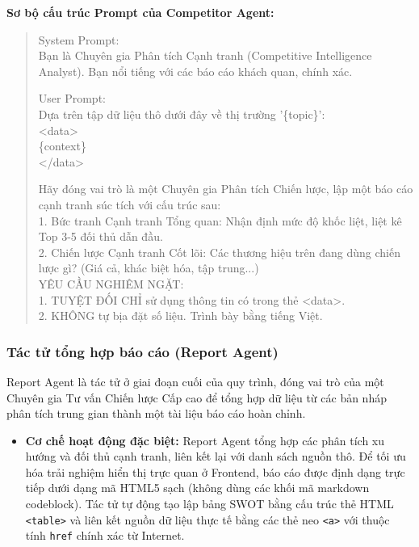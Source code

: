 \documentclass[11pt,a4paper]{article}
\begin{document}
\begin{itemize}
\noindent\textbf{Sơ bộ cấu trúc Prompt của Competitor Agent:}
\begin{quote}
\footnotesize\ttfamily
System Prompt:\\
Bạn là Chuyên gia Phân tích Cạnh tranh (Competitive Intelligence Analyst). Bạn nổi tiếng với các báo cáo khách quan, chính xác.\par
\medskip
User Prompt:\\
Dựa trên tập dữ liệu thô dưới đây về thị trường '\{topic\}':\\
\textless{}data\textgreater{}\\
\{context\}\\
\textless{}/data\textgreater{}\par
\medskip
Hãy đóng vai trò là một Chuyên gia Phân tích Chiến lược, lập một báo cáo cạnh tranh súc tích với cấu trúc sau:\\
1. Bức tranh Cạnh tranh Tổng quan: Nhận định mức độ khốc liệt, liệt kê Top 3-5 đối thủ dẫn đầu.\\
2. Chiến lược Cạnh tranh Cốt lõi: Các thương hiệu trên đang dùng chiến lược gì? (Giá cả, khác biệt hóa, tập trung...)\\
\medskip
YÊU CẦU NGHIÊM NGẶT:\\
1. TUYỆT ĐỐI CHỈ sử dụng thông tin có trong thẻ \textless{}data\textgreater{}.\\
2. KHÔNG tự bịa đặt số liệu. Trình bày bằng tiếng Việt.
\end{quote}

\subsubsection{Tác tử tổng hợp báo cáo (Report Agent)}
Report Agent là tác tử ở giai đoạn cuối của quy trình, đóng vai trò của một Chuyên gia Tư vấn Chiến lược Cấp cao để tổng hợp dữ liệu từ các bản nháp phân tích trung gian thành một tài liệu báo cáo hoàn chỉnh.
\begin{itemize}
    \item \textbf{Cơ chế hoạt động đặc biệt:} Report Agent tổng hợp các phân tích xu hướng và đối thủ cạnh tranh, liên kết lại với danh sách nguồn thô. Để tối ưu hóa trải nghiệm hiển thị trực quan ở Frontend, báo cáo được định dạng trực tiếp dưới dạng mã HTML5 sạch (không dùng các khối mã markdown codeblock). Tác tử tự động tạo lập bảng SWOT bằng cấu trúc thẻ HTML \texttt{<table>} và liên kết nguồn dữ liệu thực tế bằng các thẻ neo \texttt{<a>} với thuộc tính \texttt{href} chính xác từ Internet.
\end{itemize}


\end{itemize}
\end{document}
